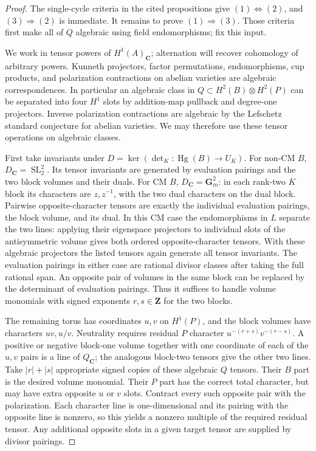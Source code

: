 \documentclass[11pt,reqno]{article}
\theoremstyle{emphasizedplain}
\theoremstyle{emphasizeddefinition}
\theoremstyle{emphasizeddefinition}
\DeclareMathOperator{\Hg}{Hg}
\DeclareMathOperator{\SL}{SL}
\newcommand{\C}{\mathbf C}
\newcommand{\Z}{\mathbf Z}
\begin{document}
\begin{proof}
The single-cycle criteria in the cited propositions give
$(1)\Longleftrightarrow(2)$, and $(3)\Longrightarrow(2)$ is immediate.
It remains to prove $(1)\Longrightarrow(3)$. Those criteria first make
all of $Q$ algebraic using field endomorphisms; fix this input.

We work in tensor powers of $H^1(A)_\C$; alternation will recover
cohomology of arbitrary powers. Kunneth projectors, factor permutations,
endomorphisms, cup products, and polarization contractions on abelian
varieties are algebraic correspondences. In particular an algebraic
class in $Q\subset H^2(B)\otimes H^2(P)$ can be separated into four
$H^1$ slots by addition-map pullback and degree-one projectors.
Inverse polarization contractions are algebraic by the Lefschetz
standard conjecture for abelian varieties. We may therefore use these
tensor operations on algebraic classes.

First take invariants under $D=\ker(\det_K:\Hg(B)\to U_K)$.
For non-CM $B$, $D_\C=\SL_2^2$. Its tensor invariants are generated
by evaluation pairings and the two block volumes and their duals.
For CM $B$, $D_\C=\mathbf G_m^2$: in each rank-two $K$ block its
characters are $z,z^{-1}$, with the two dual characters on the dual
block. Pairwise opposite-character tensors are exactly the individual
evaluation pairings, the block volume, and its dual. In this CM case the endomorphisms
in $L$ separate the two lines: applying their eigenspace projectors
to individual slots of the antisymmetric volume gives both ordered
opposite-character tensors. With these algebraic projectors the
listed tensors again generate all tensor invariants. The evaluation pairings in either
case are rational divisor classes after taking the full rational span.
An opposite pair of volumes in the same block can be replaced by the
determinant of evaluation pairings. Thus it suffices to handle volume
monomials with signed exponents $r,s\in\Z$ for the two blocks.

The remaining torus has coordinates $u,v$ on $H^1(P)$, and the block
volumes have characters $uv,u/v$. Neutrality requires residual $P$
character $u^{-(r+s)}v^{-(r-s)}$. A positive or negative block-one
volume together with one coordinate of each of the $u,v$ pairs is a
line of $Q_\C$; the analogous block-two tensors give the other two
lines. Take $|r|+|s|$ appropriate signed copies of these algebraic
$Q$ tensors. Their $B$ part is the desired volume monomial.
Their $P$ part has the correct total character, but may have extra
opposite $u$ or $v$ slots. Contract every such opposite pair with the
polarization. Each character line is one-dimensional and its pairing
with the opposite line is nonzero, so this yields a nonzero multiple
of the required residual tensor. Any additional opposite slots in a
given target tensor are supplied by divisor pairings.


\end{proof}
\end{document}
